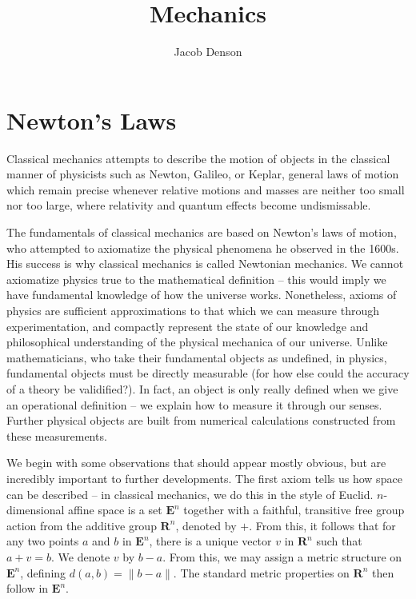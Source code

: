 

\title{Mechanics}
\author{Jacob Denson}




\maketitle



\chapter{Newton's Laws}

Classical mechanics attempts to describe the motion of objects in the classical manner of physicists such as Newton, Galileo, or Keplar, general laws of motion which remain precise whenever relative motions and masses are neither too small nor too large, where relativity and quantum effects become undismissable.

The fundamentals of classical mechanics are based on Newton's laws of motion, who attempted to axiomatize the physical phenomena he observed in the 1600s. His success is why classical mechanics is called Newtonian mechanics. We cannot axiomatize physics true to the mathematical definition -- this would imply we have fundamental knowledge of how the universe works. Nonetheless, axioms of physics are sufficient approximations to that which we can measure through experimentation, and compactly represent the state of our knowledge and philosophical understanding of the physical mechanica of our universe. Unlike mathematicians, who take their fundamental objects as undefined, in physics, fundamental objects must be directly measurable (for how else could the accuracy of a theory be validified?). In fact, an object is only really defined when we give an operational definition -- we explain how to measure it through our senses. Further physical objects are built from numerical calculations constructed from these measurements.

We begin with some observations that should appear mostly obvious, but are incredibly important to further developments. The first axiom tells us how space can be described -- in classical mechanics, we do this in the style of Euclid. $n$-dimensional affine space is a set $\mathbf{E}^n$ together with a faithful, transitive free group action from the additive group $\mathbf{R}^n$, denoted by $+$. From this, it follows that for any two points $a$ and $b$ in $\mathbf{E}^n$, there is a unique vector $v$ in $\mathbf{R}^n$ such that $a + v = b$. We denote $v$ by $b - a$. From this, we may assign a metric structure on $\mathbf{E}^n$, defining $d(a,b) = \| b - a \|$. The standard metric properties on $\mathbf{R}^n$ then follow in $\mathbf{E}^n$.

